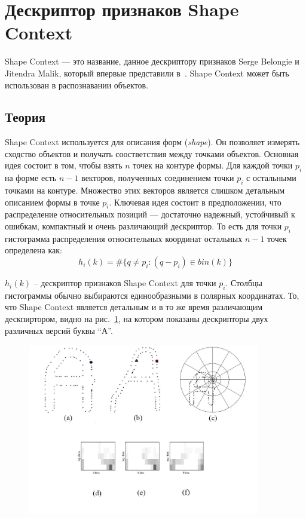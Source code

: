 \section{Дескриптор признаков Shape Context}
Shape Context --- это название, данное дескриптору признаков Serge Belongie и Jitendra Malik, который впервые представили в~\cite{belongie002}. Shape Context может быть использован в распознавании объектов.

\subsection{Теория}
Shape Context используется для описания форм (\emph{shape}). Он позволяет измерять сходство объектов и получать соостветствия между точками объектов. Основная идея состоит в том, чтобы взять $n$ точек на контуре формы. Для каждой точки $p_i$ на форме есть $n-1$ векторов, полученных соединением точки $p_i$ с остальными точками на контуре. Множество этих векторов является слишком детальным описанием формы в точке $p_i$. Ключевая идея состоит в предположении, что распределение относительных позиций --- достаточно надежный, устойчивый к ошибкам, компактный и очень различающий дескриптор. То есть для точки $p_i$ гистограмма распределения относительных координат остальных $n-1$ точек определена как:
\begin{displaymath}
  h_i(k) = \#\{q \neq p_i : (q - p_i) \in bin(k)\}
\end{displaymath}

$h_i(k)$ -- дескриптор признаков Shape Context для точки $p_i$. Столбцы гистограммы обычно выбираются единообразными в полярных координатах. То, что Shape Context является детальным и в то же время различающим дескпиртором, видно на рис.~\ref{shape-context}, на котором показаны дескрипторы двух различных версий буквы ``А''.

\begin{figure}
  \centering
  \includegraphics[width=0.9\textwidth]{images/shape-context.png}
  \caption{\label{shape-context}}
\end{figure}

